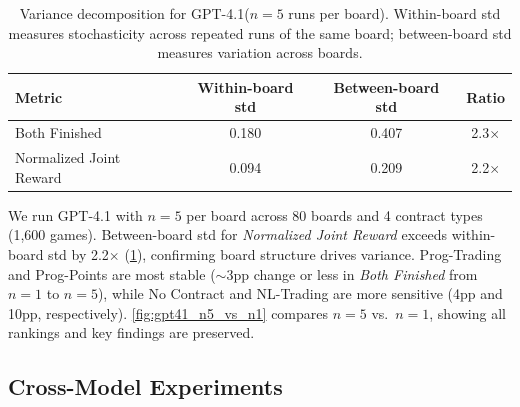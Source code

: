 \documentclass{article} %
\newcommand{\PTC}{Prog-Trading\xspace}
\newcommand{\NLTC}{NL-Trading\xspace}
\newcommand{\PPC}{Prog-Points\xspace}
\newcommand{\GPT}{GPT-4.1\xspace}
\begin{document}
\begin{table}[t]
\centering
\begin{small}
\begin{tabular}{lccc}
\toprule
\textbf{Metric} & \textbf{Within-board std} & \textbf{Between-board std} & \textbf{Ratio} \\
\midrule
Both Finished & 0.180 & 0.407 & 2.3$\times$ \\
Normalized Joint Reward & 0.094 & 0.209 & 2.2$\times$ \\
\bottomrule
\end{tabular}
\end{small}
\caption{Variance decomposition for \GPT ($n=5$ runs per board). Within-board std measures stochasticity across repeated runs of the same board; between-board std measures variation across boards.}
\label{tab:variance_decomp}
\end{table}

We run \GPT with $n=5$ per board across 80 boards and 4 contract types (1,600 games). Between-board std for \textit{Normalized Joint Reward} exceeds within-board std by 2.2$\times$ (\cref{tab:variance_decomp}), confirming board structure drives variance. \PTC and \PPC are most stable ($\sim$3pp change or less in \textit{Both Finished} from $n=1$ to $n=5$), while No Contract and \NLTC are more sensitive (4pp and 10pp, respectively). \cref{fig:gpt41_n5_vs_n1} compares $n=5$ vs.\ $n=1$, showing all rankings and key findings are preserved.

%
\FloatBarrier

\subsection{\textbf{Cross-Model Experiments}}
\label{sec:cross_model}
\end{document}
